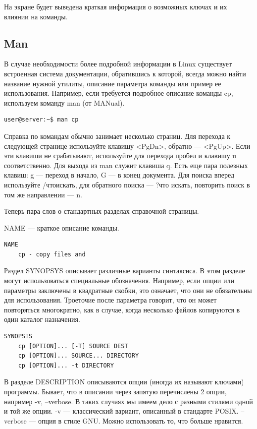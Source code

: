 \documentclass[14pt, a4paper]{article}
\begin{document}
На экране будет выведена краткая информация о возможных ключах и их влиянии на команды.



\subsection*{Man}

В случае необходимости более подробной информации в Linux существует встроенная
система документации, обратившись к которой, всегда можно найти название нужной утилиты,
описание параметра команды или пример ее использования. Например, если требуется
подробное описание команды cp, используем команду man (от MANual).

\begin{lstlisting}
user@server:~$ man cp
\end{lstlisting}

Справка по командам обычно занимает несколько страниц. Для перехода к следующей
странице используйте клавишу <PgDn>, обратно — <PgUp>. Если эти клавиши не срабатывают,
используйте для перехода пробел и клавишу u соответственно. Для выхода из man служит клавиша
q. Есть еще пара полезных клавиш: g — переход в начало, G — в конец документа. Для поиска вперед
используйте /чтоискать, для обратного поиска — ?что искать, повторить поиск в том же направлении
— n.

Теперь пара слов о стандартных разделах справочной страницы.

NAME — краткое описание команды.

\begin{lstlisting}
NAME
    cp - copy files and
\end{lstlisting}

Раздел SYNOPSYS описывает различные варианты синтаксиса. В этом разделе могут
использоваться специальные обозначения. Например, если опции или параметры заключены в
квадратные скобки, это означает, что они не обязательны для использования. Троеточие после
параметра говорит, что он может повторяться многократно, как в случае, когда несколько файлов
копируются в один каталог назначения.

\begin{lstlisting}
SYNOPSIS
    cp [OPTION]... [-T] SOURCE DEST
    cp [OPTION]... SOURCE... DIRECTORY
    cp [OPTION]... -t DIRECTORY
\end{lstlisting}

В разделе DESCRIPTION описываются опции (иногда их называют ключами) программы.
Бывает, что в описании через запятую перечислены 2 опции, например -v, --verbose. В таких случаях
мы имеем дело с разными стилями одной и той же опции. -v — классический вариант, описанный в
стандарте POSIX. --verbose — опция в стиле GNU. Можно использовать то, что больше нравится.
\end{document}
